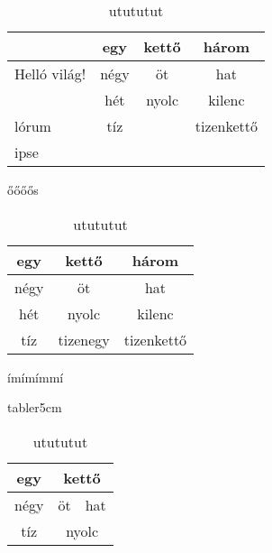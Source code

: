 \documentclass{article}
\begin{document}
\hulipsum[1]



\begin{table}

\begin{tabular}{p{3em}||ccc|}
&egy&kettő&három \\ \hline\hline
Helló \newline világ!&négy&öt&hat \\  \cline{2-4}
&hét&nyolc&kilenc \\ \cline{2-2}\cline{4-4}
lórum&tíz&&tizenkettő\\
ipse&&&\\ \hline
\end{tabular} \caption[val]{őőőős} \label{tab1}

\vspace{2cm}

\begin{tabular}{c|c|c}
egy&kettő&három \\ \hline
négy&öt&hat \\  
hét&nyolc&kilenc \\ 
tíz&tizenegy&tizenkettő\\
\end{tabular} \caption[vala]{ímímímmí} \label{tab2}

\begin{wrapfloat}{table}{r}{5cm}
\begin{tabular}{c|c|c|}
egy& \multicolumn{2}{c|}{kettő} \\ \hline
\multirow{2}{2em}{négy}&öt&hat \\  \cline{2-3}
&\multicolumn{2}{c|}{\multirow{2}{2em}{nyolc}} \\ \cline{1-1}
tíz&\multicolumn{2}{c|}{}\\\hline
\end{tabular} \caption[valam]{utututut} \label{tab3}
\end{wrapfloat}



\end{table}
\end{document}
